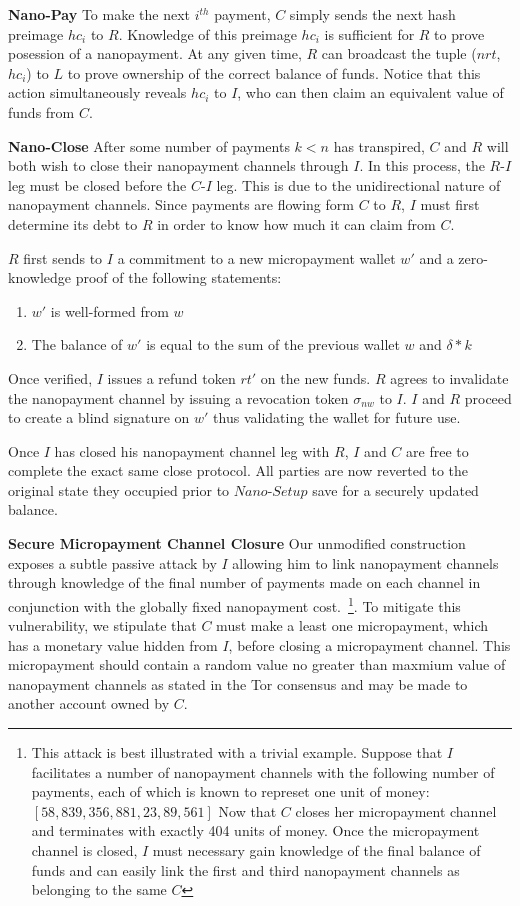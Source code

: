 \textbf{Nano-Pay} To make the next $i^{th}$ payment, $C$ simply sends the next
hash preimage $hc_i$ to $R$. Knowledge of this preimage $hc_i$ is sufficient for
$R$ to prove posession of a nanopayment. At any given time, $R$ can broadcast
the tuple ($nrt$, $hc_i$) to $L$ to prove ownership of the correct balance of
funds. Notice that this action simultaneously reveals $hc_i$ to $I$, who can
then claim an equivalent value of funds from $C$.

\textbf{Nano-Close} After some number of payments $k < n$ has transpired, $C$ and $R$ will both wish
to close their nanopayment channels through $I$. In this process, the $R$-$I$ leg
must be closed before the $C$-$I$ leg. This is due to the unidirectional nature
of nanopayment channels. Since payments are flowing form $C$ to $R$, $I$ must
first determine its debt to $R$ in order to know how much it can claim from $C$.

$R$ first sends to $I$ a commitment to a new micropayment wallet $w'$ and a
zero-knowledge proof of the following statements:

\begin{enumerate}
\item $w'$ is well-formed from $w$
\item The balance of $w'$ is equal to the sum of the previous wallet $w$ and
  $\delta * k$
\end{enumerate}

Once verified, $I$ issues a refund token $rt'$ on the new funds. $R$ agrees to
invalidate the nanopayment channel by issuing a revocation token $\sigma_{nw}$
to $I$. $I$ and $R$ proceed to create a blind signature on $w'$ thus validating
the wallet for future use.

Once $I$ has closed his nanopayment channel leg with $R$, $I$ and $C$ are free
to complete the exact same close protocol. All parties are now reverted to the
original state they occupied prior to $Nano$-$Setup$ save for a securely updated
balance.

\textbf{Secure Micropayment Channel Closure} Our unmodified construction exposes
a subtle passive attack by $I$ allowing him to link nanopayment channels through
knowledge of the final number of payments made on each channel in conjunction
with the globally fixed nanopayment cost.~\footnote{This attack is best
  illustrated with a trivial example. Suppose that $I$ facilitates a number of
  nanopayment channels with the following number of payments, each of which is
  known to represet one unit of money: $[58, 839, 356, 881, 23, 89, 561]$ Now
  that $C$ closes her micropayment channel and terminates with exactly 404 units
  of money. Once the micropayment channel is closed, $I$ must necessary gain
  knowledge of the final balance of funds and can easily link the first and
  third nanopayment channels as belonging to the same $C$}. To mitigate this
vulnerability, we stipulate that $C$ must make a least one micropayment, which
has a monetary value hidden from $I$, before closing a micropayment
channel. This micropayment should contain a random value no greater than maxmium
value of nanopayment channels as stated in the Tor consensus and may be made to
another account owned by $C$.

